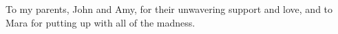 \begin{dedication}
    To my parents, John and Amy, for their unwavering support and love, and to Mara for putting up with all of the madness.

\end{dedication}

